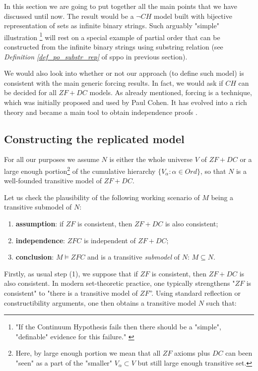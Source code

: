 In this section we are going to put together all the main points that we have discussed until now. The result would be a $\neg CH$ model built with bijective representation of sets as infinite binary strings. Such arguably "simple" illustration \footnote{"If the Continuum Hypothesis fails then there should be a "simple", "definable" evidence for this failure." \cite{magidor2011}} will rest on a special example of partial order that can be constructed from the infinite binary strings using substring relation (see \textit{Definition \ref{def_po_substr_rep}} of sppo in previous section). 

We would also look into whether or not our approach (to define such model) is consistent with the main generic forcing results. In fact, we would ask if $CH$ can be decided for all $ZF+DC$ models. As already mentioned, forcing is a technique, which was initially proposed and used by Paul Cohen. It has evolved into a rich theory and became a main tool to obtain independence proofs \cite{jech2003set}. 

\subsection{Constructing the replicated model}

For all our purposes we assume $N$ is either the whole universe $V$ of $ZF+DC$ or a large enough portion\footnote{Here, by large enough portion we mean that all $ZF$ axioms plus $DC$ can been "seen" as a part of the "smaller" $V_\alpha \subset V$ but still large enough transitive set.} of the cumulative hierarchy $\{V_\alpha : \alpha \in Ord\}$, so that $N$ is a well-founded transitive model of $ZF+DC$.

Let us check the plausibility of the following working scenario of $M$ being a transitive submodel of $N$: 
\begin{enumerate}
    \item \textbf{assumption}: if $ZF$ is consistent, then $ZF+DC$ is also consistent;
    \item \textbf{independence}: $ZFC$ is independent of $ZF+DC$;
    \item \textbf{conclusion}: $M \models ZFC$ and is a transitive \textit{submodel} of $N$: $M \subseteq N$.
\end{enumerate}

Firstly, as usual step (1), we suppose that if $ZF$ is consistent, then $ZF+DC$ is also consistent. In modern set-theoretic practice, one typically strengthens "$ZF$ is consistent" to "there is a transitive model of $ZF$”. Using standard reflection or constructibility arguments, one then obtains a transitive model $N$ such that:

